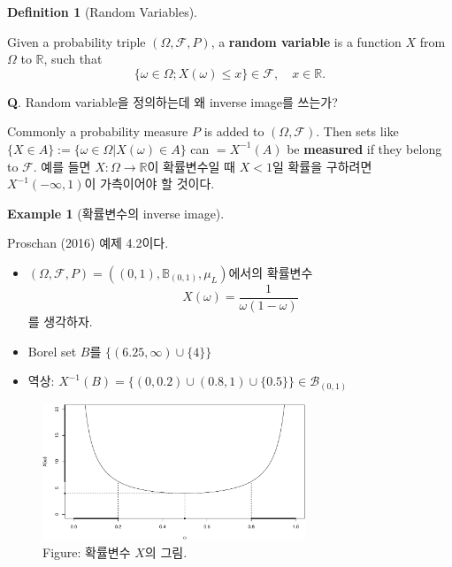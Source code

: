 \documentclass[
  13pt,
  letterpaper,
  DIV=11,
  numbers=noendperiod]{scrreprt}
\theoremstyle{definition}
\newtheorem{definition}{Definition}[chapter]
\theoremstyle{plain}
\theoremstyle{definition}
\theoremstyle{plain}
\theoremstyle{plain}
\theoremstyle{definition}
\newtheorem{example}{Example}[chapter]
\theoremstyle{remark}
\begin{document}
\begin{definition}[Random
Variables]\protect\hypertarget{def-rvs}{}\label{def-rvs}

Given a probability triple \((\Omega, \mathcal{F}, P)\), a
\textbf{random variable} is a function \(X\) from \(\Omega\) to
\(\mathbb{R}\), such that \[
\{ \omega \in \Omega; X(\omega) \leq x  \} \in \mathcal{F} ,\quad{} x \in \mathbb{R}.
\]

\end{definition}

\textbf{Q}. Random variable을 정의하는데 왜 inverse image를 쓰는가?

Commonly a probability measure \(P\) is added to
\((\Omega, \mathcal{F})\). Then sets like
\(\{X \in A\}:= \{\omega \in \Omega | X(\omega) \in A\}\) can
\(=X^{-1}(A)\) be \textbf{measured} if they belong to \(\mathcal{F}\).
예를 들면 \(X: \Omega \rightarrow \mathbb{R}\)이 확률변수일 때 \(X<1\)일
확률을 구하려면 \(X^{-1}(-\infty, 1)\)이 가측이어야 할 것이다.

\begin{example}[확률변수의 inverse
image]\protect\hypertarget{exm-rvs}{}\label{exm-rvs}

Proschan (2016) 예제 4.2이다.

\begin{itemize}
\item
  \((\Omega, \mathcal{F}, P) = ((0,1),\mathbb{B}_{(0,1)}, \mu_L)\)에서의
  확률변수 \[
  X(\omega) = \frac{1}{\omega (1-\omega)}
  \] 를 생각하자.
\item
  Borel set \(B\)를 \(\{ (6.25, \infty) \cup \{4\}\}\)
\item
  역상:
  \(X^{-1}(B) = \{ (0,0.2) \cup (0.8,1) \cup \{0.5\} \} \in \mathcal{B}_{(0,1)}\)
\end{itemize}

\begin{figure}[th]

{\centering \includegraphics[width=0.7\textwidth,height=\textheight]{rvs_files/figure-pdf/unnamed-chunk-2-1.pdf}

}

\caption{Figure: 확률변수 \(X\)의 그림.}

\end{figure}%

\end{example}
\end{document}
